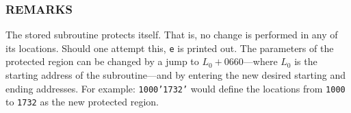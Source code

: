 \subsubsection*{REMARKS}
The stored subroutine protects itself. That is, no change is performed in any of its locations. Should one attempt this, \texttt{e} is printed out. The parameters of the protected region can be changed by a jump to $L_0 + 0660$—where $L_0$ is the starting address of the subroutine—and by entering the new desired starting and ending addresses. For example: \texttt{1000'1732'} would define the locations from \texttt{1000} to \texttt{1732} as the new protected region.
\newpage